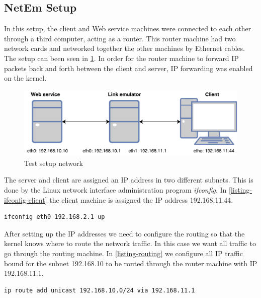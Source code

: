 \subsection{NetEm Setup}

In this setup, the client and Web service machines were connected to each other
through a third computer, acting as a router. This router machine had two
network cards and networked together the other machines by Ethernet cables. The
setup can been seen in \cref{figure-testing-environment}. In order for the
router machine to forward IP packets back and forth between the client and
server, IP forwarding was enabled on the kernel.

\begin{figure}[h]
\includegraphics[scale=0.73]{images/testing_environment.pdf}
\caption{Test setup network}
\label{figure-testing-environment}
\end{figure}

The server and client are assigned an IP address in two different subnets.
This is done by the Linux network interface administration program
\textit{ifconfig}. In \cref{listing-ifconfig-client} the client machine is
assigned the IP address 192.168.11.44.

\begin{lstlisting}[frame=single, caption="Configuring a network interface of the router", label=listing-ifconfig-client]
ifconfig eth0 192.168.2.1 up
\end{lstlisting}

After setting up the IP addresses we need to configure the routing so that the
kernel knows where to route the network traffic. In this case we want all
traffic to go through the routing machine. In \cref{listing-routing} we
configure all IP traffic bound for the subnet 192.168.10 to be routed through
the router machine with IP 192.168.11.1.

\begin{lstlisting}[frame=single, caption="Configuring routing rules for the client", label=listing-routing]
ip route add unicast 192.168.10.0/24 via 192.168.11.1
\end{lstlisting}


